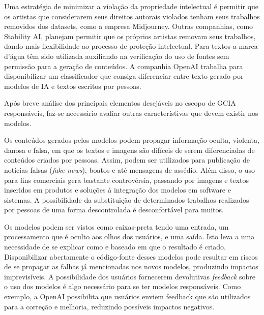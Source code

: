 Uma estratégia de minimizar a violação da propriedade intelectual é permitir que os artistas que considerarem seus direitos autorais
violados tenham seus trabalhos removidos dos datasets, como a empresa Midjourney. 
Outras companhias, como Stability AI, planejam permitir que os próprios artistas removam seus trabalhos, 
dando mais flexibilidade ao processo de proteção intelectual. 
Para textos a marca d'água têm sido utilizada auxiliando na verificação do uso de fontes sem permissão para a geração 
de conteúdos. A companhia OpenAI trabalha para disponibilizar um classificador que consiga diferenciar entre 
texto gerado por modelos de IA e textos escritos por pessoas.


Após breve análise dos principais elementos desejáveis no escopo de GCIA responsáveis, faz-se necessário avaliar  
outras característivas que devem existir nos modelos.

Os conteúdos gerados pelos modelos podem propagar informação oculta, violenta, danosa e falsa, em que os textos e 
imagens são difíceis de serem diferenciadas de conteúdos criados por pessoas. Assim, podem ser utilizados para publicação de notícias falsas (\textit{fake news}), boatos e até mensagens de assédio. 
Além disso, o uso para fins comerciais gera bastante controvérsia, passando por imagens e textos inseridos 
em produtos e soluções à integração dos modelos em software e sistemas. A possibilidade da substituição 
de determinados trabalhos realizados por pessoas de uma forma descontrolada é desconfortável para muitos.

Os modelos podem ser vistos como caixas-preta tendo uma entrada, um processamento que é oculto aos olhos dos usuários, 
e uma saída. Isto leva a uma necessidade de se explicar como e baseado em que o resultado é criado.
Disponibilizar abertamente o código-fonte desses modelos pode resultar em riscos de se propagar as falhas 
já mencionadas nos novos modelos, produzindo impactos imprevisíveis. 
A possibilidade dos usuários fornecerem devolutivas \textit{feedback} sobre o uso dos modelos é algo necessário
para se ter modelos responsáveis. Como exemplo, a OpenAI possibilita que usuários enviem feedback
que são utilizados para a correção e melhoria, reduzindo possíveis impactos negativos.


